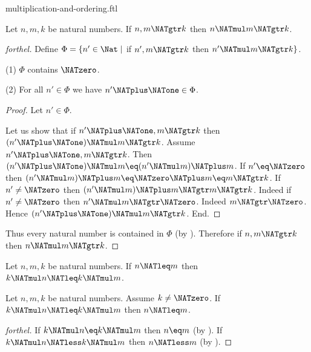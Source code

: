\documentclass{naproche-library}
\begin{document}
\begin{smodule}[title=Multiplication and Ordering]{multiplication-and-ordering.ftl}
\begin{proposition}[forthel,id=ARITHMETIC_06_1826268599287808]
  Let $n, m, k$ be natural numbers.
  If $n, m \NATgtr k$ then $n \NATmul m \NATgtr k$.
\end{proposition}
\begin{proof}[forthel]
  Define $\Phi = \{ n' \in \Nat \mid$ if $n', m \NATgtr k$ then $n' \NATmul m \NATgtr k \}$.

  (1) $\Phi$ contains $\NATzero$.

  (2) For all $n' \in \Phi$ we have $n' \NATplus \NATone \in \Phi$.
  \begin{proof}
    Let $n' \in \Phi$.

    Let us show that if $n' \NATplus \NATone, m \NATgtr k$ then $(n' \NATplus \NATone) \NATmul m \NATgtr k$.
      Assume $n' \NATplus \NATone, m \NATgtr k$.
      Then $(n' \NATplus \NATone) \NATmul m \eq (n' \NATmul m) \NATplus m$.
      If $n' \eq \NATzero$ then
      $(n' \NATmul m) \NATplus m
        \eq \NATzero \NATplus m
        \eq m
        \NATgtr k$.
      If $n' \neq \NATzero$ then
      $(n' \NATmul m) \NATplus m
        \NATgtr m
        \NATgtr k$.
      Indeed if $n' \neq \NATzero$ then $n' \NATmul m \NATgtr \NATzero$.
      Indeed $m \NATgtr \NATzero$.
      Hence $(n' \NATplus \NATone) \NATmul m \NATgtr k$.
    End.
  \end{proof}

  Thus every natural number is contained in $\Phi$ (by ).
  Therefore if $n, m \NATgtr k$ then $n \NATmul m \NATgtr k$.
\end{proof}

\begin{corollary}[forthel,id=ARITHMETIC_06_1751605544222720]
  Let $n, m, k$ be natural numbers.
  If $n \NATleq m$ then $k \NATmul n \NATleq k \NATmul m$.
\end{corollary}

\begin{corollary}[forthel,id=ARITHMETIC_06_3965209318260736]
  Let $n, m, k$ be natural numbers.
  Assume $k \neq \NATzero$.
  If $k \NATmul n \NATleq k \NATmul m$ then $n \NATleq m$.
\end{corollary}
\begin{proof}[forthel]
  If $k \NATmul n \eq k \NATmul m$ then $n \eq m$ (by ).
  If $k \NATmul n \NATless k \NATmul m$ then $n \NATless m$ (by ).
\end{proof}


\end{smodule}
\end{document}
